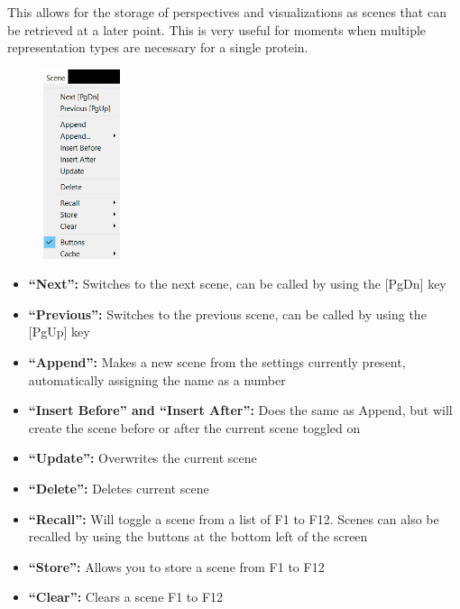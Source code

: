 \documentclass{article}
\begin{document}
This allows for the storage of perspectives and visualizations as scenes that can be retrieved at a later point. This is very useful for moments when multiple representation types are necessary for a single protein. \\

\begin{figure}[h!]
    \centering
    \includegraphics[width=0.2\textwidth]{workshops/pymol/imgs/scenetab.png}
    \caption[]{}
    \label{scenetab}
\end{figure}

\begin{itemize}

\item \textbf{“Next”:}  Switches to the next scene, can be called by using the [PgDn] key

\item \textbf{“Previous”:}  Switches to the previous scene, can be called by using the [PgUp] key

\item \textbf{“Append”:}  Makes a new scene from the settings currently present, automatically assigning the name as a number

\item \textbf{“Insert Before” and “Insert After”:}  Does the same as Append, but will create the scene before or after the current scene toggled on

\item \textbf{“Update”:}  Overwrites the current scene 

\item \textbf{“Delete”:}  Deletes current scene

\item \textbf{“Recall”:}  Will toggle a scene from a list of F1 to F12. Scenes can also be recalled by using the buttons at the bottom left of the screen

\item \textbf{“Store”:}  Allows you to store a scene from F1 to F12

\item \textbf{“Clear”:}  Clears a scene F1 to F12

\end{itemize}
\end{document}
